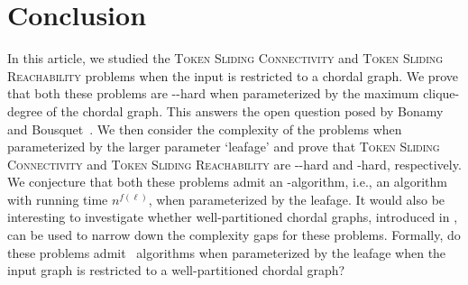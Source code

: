 \section{Conclusion}
\label{sec:conclusion}
In this article, we studied the \textsc{Token Sliding Connectivity} 
and \textsc{Token Sliding Reachability} problems when the input 
is restricted to a chordal graph. 
We prove that both these problems are \para-\NP-hard 
when parameterized by the maximum clique-degree of the chordal graph. 
This answers the open question posed by 
Bonamy and Bousquet~\cite{DBLP:conf/wg/BonamyB17}. 
We then consider the complexity of the problems when 
parameterized by the larger parameter {`leafage'} and 
prove that \textsc{Token Sliding Connectivity} and 
\textsc{Token Sliding Reachability} are \co-\W[1]-hard and \W[1]-hard, 
respectively. 
We conjecture that both these problems admit an \XP-algorithm, i.e., an 
algorithm with running time $n^{f(\ell)}$, when parameterized by the leafage. 
It would also be interesting to {investigate} whether well-partitioned chordal 
graphs, introduced in \cite{DBLP:journals/dm/AhnJKL22}, can be used to 
narrow down the complexity gaps for these problems. 
Formally, do these problems admit \FPT\ algorithms when 
parameterized by the leafage when the input graph is restricted 
to a well-partitioned chordal graph?


